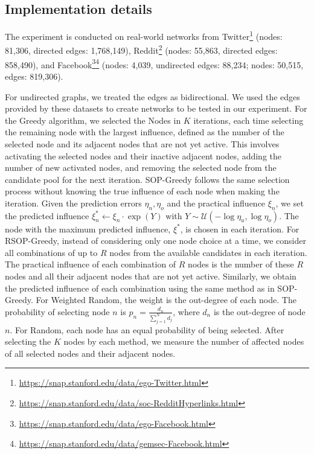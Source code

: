 \subsection{Implementation details} \label{appendix:experiment2-implementation-details}
The experiment is conducted on real-world networks from Twitter\footnote{\url{https://snap.stanford.edu/data/ego-Twitter.html}}\cite{facebook&twitter} (nodes: 81,306, directed edges: 1,768,149), Reddit\footnote{\url{https://snap.stanford.edu/data/soc-RedditHyperlinks.html}}\cite{reddit} (nodes: 55,863, directed edges: 858,490), and Facebook\footnote{\url{https://snap.stanford.edu/data/ego-Facebook.html}}\footnote{\url{https://snap.stanford.edu/data/gemsec-Facebook.html}}\cite{facebook&twitter,facebook2} (nodes: 4,039, undirected edges: 88,234; nodes: 50,515, edges: 819,306).

For undirected graphs, we treated the edges as bidirectional. We used the edges provided by these datasets to create networks to be tested in our experiment. For the Greedy algorithm, we selected the Nodes in $K$ iterations, each time selecting the remaining node with the largest influence, defined as the number of the selected node and its adjacent nodes that are not yet active. This involves activating the selected nodes and their inactive adjacent nodes,  adding the number of new activated nodes, and removing the selected node from the candidate pool for the next iteration. SOP-Greedy follows the same selection process without knowing the true influence of each node when making the iteration. Given the prediction errors $\eta_n, \eta_o$ and the practical influence $\xi_n$, we set the predicted influence $\xi^*_n \gets \xi_n \cdot \exp(Y)$ with $Y \sim \mathcal{U}(-\log \eta_u, \log \eta_o)$. The node with the maximum predicted influence, $ \xi^* $, is chosen in each iteration. For RSOP-Greedy, instead of considering only one node choice at a time, we consider all combinations of up to $R$ nodes from the available candidates in each iteration. The practical influence of each combination of $R$ nodes is the number of these $R$ nodes and all their adjacent nodes that are not yet active. Similarly, we obtain the predicted influence of each combination using the same method as in SOP-Greedy. For Weighted Random, the weight is the out-degree of each node. The probability of selecting node $n$ is $p_n = \frac{d_n}{\sum_{j=1}^N d_j}$, where $d_n$ is the out-degree of node $n$. For Random, each node has an equal probability of being selected. After selecting the $K$ nodes by each method, we measure the number of affected nodes of all selected nodes and their adjacent nodes.


